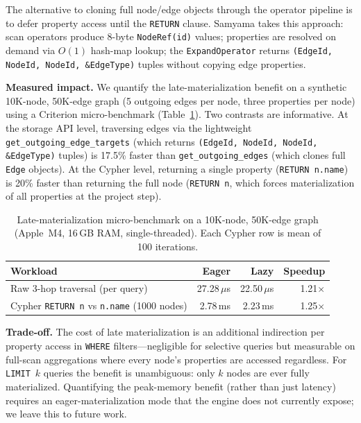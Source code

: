 \documentclass[runningheads]{llncs}
\begin{document}
The alternative to cloning full node/edge objects through the
operator pipeline is to defer property access until the
\texttt{RETURN} clause.  Samyama takes this approach: scan operators
produce 8-byte \texttt{NodeRef(id)} values; properties are resolved
on demand via $O(1)$ hash-map lookup; the \texttt{ExpandOperator}
returns \texttt{(EdgeId, NodeId, NodeId, \&EdgeType)} tuples without
copying edge properties.

\smallskip\noindent\textbf{Measured impact.}
We quantify the late-materialization benefit on a synthetic
10K-node, 50K-edge graph (5 outgoing edges per node, three
properties per node) using a Criterion micro-benchmark
(Table~\ref{tab:latemat}).  Two contrasts are informative.
At the storage API level, traversing edges via the lightweight
\texttt{get\_outgoing\_edge\_targets} (which returns \texttt{(EdgeId,
NodeId, NodeId, \&EdgeType)} tuples) is 17.5\% faster than
\texttt{get\_outgoing\_edges} (which clones full \texttt{Edge}
objects).  At the Cypher level, returning a single property
(\texttt{RETURN n.name}) is 20\% faster than returning the full
node (\texttt{RETURN n}, which forces materialization of all
properties at the project step).

\begin{table}[t]
\centering
\caption{Late-materialization micro-benchmark on a 10K-node,
  50K-edge graph (Apple~M4, 16\,GB RAM, single-threaded).
  Each Cypher row is mean of 100 iterations.}
\label{tab:latemat}
\small
\begin{tabular}{@{}lrrr@{}}
\toprule
\textbf{Workload} & \textbf{Eager} & \textbf{Lazy} & \textbf{Speedup} \\
\midrule
Raw 3-hop traversal (per query)
  & 27.28\,$\mu$s & 22.50\,$\mu$s & 1.21$\times$ \\
Cypher \texttt{RETURN n} vs \texttt{n.name} (1000 nodes)
  &  2.78\,ms & 2.23\,ms & 1.25$\times$ \\
\bottomrule
\end{tabular}
\end{table}

\noindent\textbf{Trade-off.}
The cost of late materialization is an additional indirection per
property access in \texttt{WHERE} filters---negligible for selective
queries but measurable on full-scan aggregations where every node's
properties are accessed regardless.  For \texttt{LIMIT}~$k$ queries
the benefit is unambiguous: only $k$ nodes are ever fully
materialized.  Quantifying the peak-memory benefit (rather than just
latency) requires an eager-materialization mode that the engine
does not currently expose; we leave this to future work.
\end{document}
